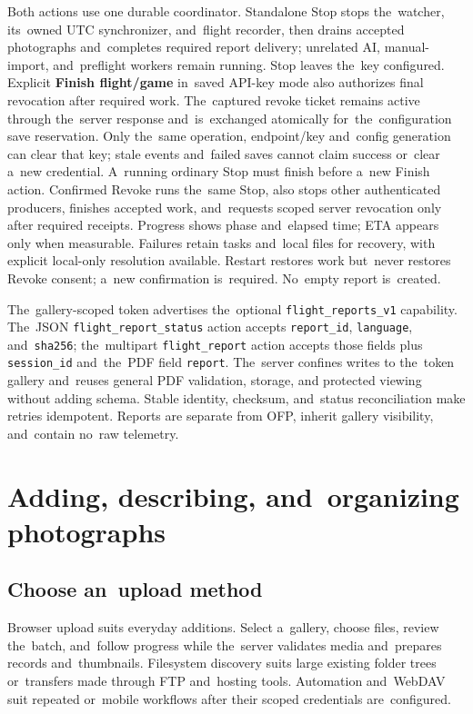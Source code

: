 \documentclass[11pt,a4paper]{article}
\newcommand{\ui}[1]{\textbf{#1}}
\begin{document}
Both actions use one durable coordinator. Standalone Stop stops the~watcher,
its~owned UTC synchronizer, and~flight recorder, then drains accepted
photographs and~completes required report delivery; unrelated AI, manual-import,
and~preflight workers remain running. Stop leaves the~key configured.
Explicit \ui{Finish flight/game} in~saved API-key mode also authorizes final
revocation after required work. The~captured revoke ticket remains active
through the~server response and~is~exchanged atomically for~the~configuration
save reservation. Only the~same operation, endpoint/key and~config generation
can clear that key; stale events and~failed saves cannot claim success or~clear
a~new credential. A~running ordinary Stop must finish before a~new Finish action.
Confirmed Revoke runs the~same Stop, also stops other authenticated producers,
finishes accepted work, and~requests scoped server revocation only after
required
receipts. Progress shows phase and~elapsed time; ETA appears only when
measurable.
Failures retain tasks and~local files for recovery, with explicit local-only
resolution available. Restart restores work but~never restores Revoke consent;
a~new confirmation is~required. No~empty report is~created.

The~gallery-scoped token advertises the~optional
\texttt{flight\_reports\_v1} capability. The~JSON
\texttt{flight\_report\_status} action accepts \texttt{report\_id},
\texttt{language}, and~\texttt{sha256}; the~multipart
\texttt{flight\_report} action accepts those fields plus
\texttt{session\_id} and~the~PDF field \texttt{report}. The~server confines
writes to the~token gallery and~reuses general PDF validation, storage, and
protected viewing without adding schema. Stable identity, checksum, and~status
reconciliation make retries idempotent. Reports are separate from OFP,
inherit gallery visibility, and~contain no~raw telemetry.

\section{Adding, describing, and~organizing photographs}
\label{sec:photo-workflow}

\subsection{Choose an~upload method}

Browser upload suits everyday additions. Select a~gallery, choose files, review
the~batch, and~follow progress while the~server validates media and~prepares
records and~thumbnails. Filesystem discovery suits large existing folder trees
or~transfers made through FTP and~hosting tools. Automation and~WebDAV suit
repeated or~mobile workflows after their scoped credentials are~configured.
\end{document}
